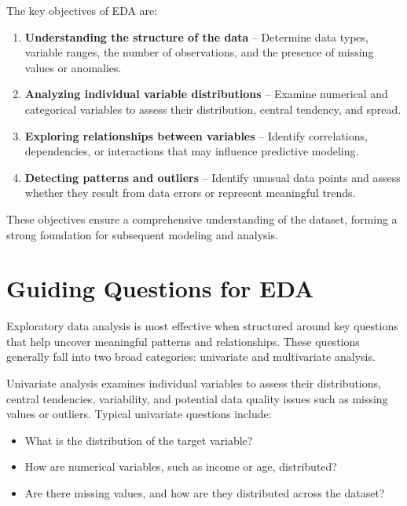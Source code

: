 \documentclass[
  11pt,
]{book}
\providecommand{\tightlist}{%
  \setlength{\itemsep}{0pt}\setlength{\parskip}{0pt}}
\theoremstyle{definition}
\theoremstyle{definition}
\theoremstyle{definition}
\theoremstyle{definition}
\theoremstyle{remark}
\begin{document}
The key objectives of EDA are:

\begin{enumerate}
\def\labelenumi{\arabic{enumi}.}
\tightlist
\item
  \textbf{Understanding the structure of the data} -- Determine data types, variable ranges, the number of observations, and the presence of missing values or anomalies.\\
\item
  \textbf{Analyzing individual variable distributions} -- Examine numerical and categorical variables to assess their distribution, central tendency, and spread.\\
\item
  \textbf{Exploring relationships between variables} -- Identify correlations, dependencies, or interactions that may influence predictive modeling.\\
\item
  \textbf{Detecting patterns and outliers} -- Identify unusual data points and assess whether they result from data errors or represent meaningful trends.
\end{enumerate}

These objectives ensure a comprehensive understanding of the dataset, forming a strong foundation for subsequent modeling and analysis.

\section{Guiding Questions for EDA}\label{guiding-questions-for-eda}

Exploratory data analysis is most effective when structured around key questions that help uncover meaningful patterns and relationships. These questions generally fall into two broad categories: univariate and multivariate analysis.

Univariate analysis examines individual variables to assess their distributions, central tendencies, variability, and potential data quality issues such as missing values or outliers. Typical univariate questions include:

\begin{itemize}
\tightlist
\item
  What is the distribution of the target variable?\\
\item
  How are numerical variables, such as income or age, distributed?\\
\item
  Are there missing values, and how are they distributed across the dataset?
\end{itemize}
\end{document}
